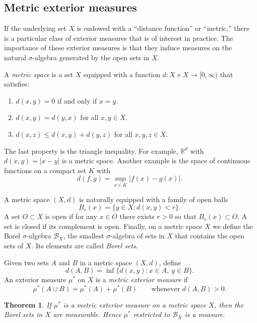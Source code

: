 \documentclass[11pt,openany]{book}
\newtheorem{theorem}{Theorem}[section]
\begin{document}
\subsection{Metric exterior measures}

If the underlying set $X$ is endowed with a ``distance function'' or ``metric,'' there is a particular class of exterior measures that is of interest in practice. The importance of these exterior measures is that they induce measures on the natural $\sigma$-algebra generated by the open sets in $X$.

A \emph{metric space} is a set $X$ equipped with a function $d:X\times X\to[0,\infty)$ that satisfies:
\begin{enumerate}
\item[(i)] $d(x,y)=0$ if and only if $x=y$.
\item[(ii)] $d(x,y)=d(y,x)$ for all $x,y\in X$.
\item[(iii)] $d(x,z)\leq d(x,y)+d(y,z)$ for all $x,y,z\in X$.
\end{enumerate}
The last property is the triangle inequality. For example, $\mathbb R^d$ with $d(x,y)=|x-y|$ is a metric space. Another example is the space of continuous functions on a compact set $K$ with
\[
d(f,g)=\sup_{x\in K}|f(x)-g(x)|.
\]

A metric space $(X,d)$ is naturally equipped with a family of open balls
\[
B_r(x)=\{y\in X:d(x,y)<r\}.
\]
A set $O\subset X$ is open if for any $x\in O$ there exists $r>0$ so that $B_r(x)\subset O$. A set is closed if its complement is open. Finally, on a metric space $X$ we define the Borel $\sigma$-algebra $\mathcal B_X$, the smallest $\sigma$-algebra of sets in $X$ that contains the open sets of $X$. Its elements are called \emph{Borel sets}.

Given two sets $A$ and $B$ in a metric space $(X,d)$, define
\[
d(A,B)=\inf\{d(x,y):x\in A,\ y\in B\}.
\]
An exterior measure $\mu^*$ on $X$ is a \emph{metric exterior measure} if
\[
\mu^*(A\cup B)=\mu^*(A)+\mu^*(B)\qquad\text{whenever }d(A,B)>0.
\]

\begin{theorem}
If $\mu^*$ is a metric exterior measure on a metric space $X$, then the Borel sets in $X$ are measurable. Hence $\mu^*$ restricted to $\mathcal B_X$ is a measure.
\end{theorem}
\end{document}
